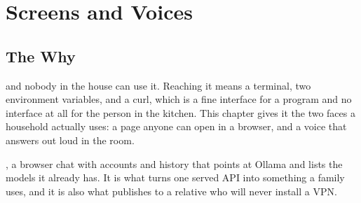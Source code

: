 %

%
\chapter{Screens and Voices}
\vspace{1.5em}


\section{The Why}

 and nobody in the house can use
it. Reaching it means a terminal, two environment variables, and a curl, which is a
fine interface for a program and no interface at all for the person in the kitchen.
This chapter gives it the two faces a household actually uses: a page anyone
can open in a browser, and a voice that answers out loud in the room.


, a browser chat with accounts and history that
points at Ollama and lists the models it already has. It is what turns one
served API into something a family uses, and it is also what publishes to a relative
who will never install a VPN.

